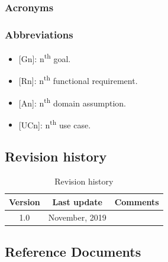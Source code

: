 \documentclass{article}
\begin{document}
			\subsubsection{Acronyms}
			\subsubsection{Abbreviations}
				\begin{itemize}
					\item {[Gn]}: n\textsuperscript{th} goal.
					\item {[Rn]}: n\textsuperscript{th} functional requirement.
					\item {[An]}: n\textsuperscript{th} domain assumption.
					\item {[UCn]}: n\textsuperscript{th} use case.
				\end{itemize}
		\subsection{Revision history}
			\begin{table}[h]
				\centering
				\begin{tabular}{c c c}
					\hline
					\textbf{Version} & \textbf{Last update} & \textbf{Comments} \\ 
					\hline
					1.0 &  \nth{10} November, 2019  & \\
					\hline
				\end{tabular}
				\caption{Revision history}
				\label{fig:Revision history}
			\end{table}
		\subsection{Reference Documents}
\end{document}
